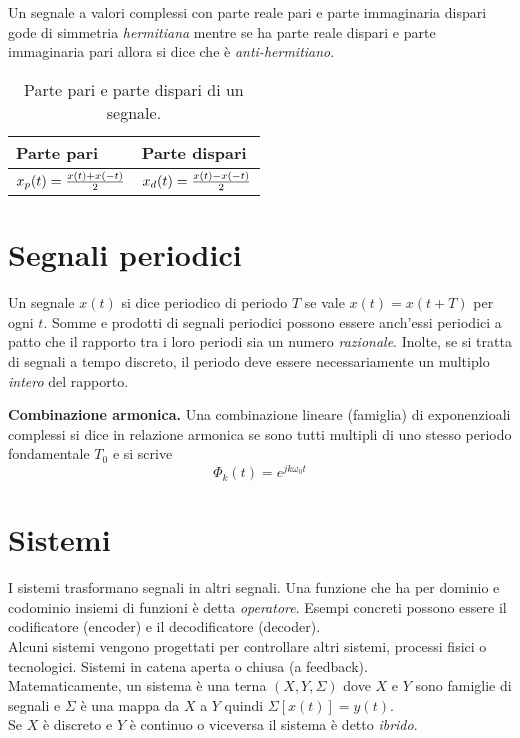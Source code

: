 \documentclass[a4paper,portrait,12pt]{article}
\theoremstyle{definition}
\begin{document}
Un segnale a valori complessi con parte reale pari e parte immaginaria dispari gode di simmetria 
\textit{hermitiana} mentre se ha parte reale dispari e parte immaginaria pari allora si dice che è
\textit{anti-hermitiano}.
\begin{table}[h]
\begin{center}
\begin{tabular}{|l||l|}
\hline Parte pari & Parte dispari\\
\hline \rule[-4mm]{0mm}{1cm} $x_p(t) = {x(t) + x(-t) \over 2}$ & $x_d(t) = {x(t) - x(-t) \over 2}$\\
\hline
\end{tabular}
\caption{Parte pari e parte dispari di un segnale.}
\end{center}
\end{table}
\bigskip


\section{Segnali periodici}

Un segnale $x(t)$ si dice periodico di periodo $T$ se vale $x(t) = x(t + T)$ per ogni $t$. Somme e prodotti
di segnali periodici possono essere anch'essi periodici a patto che il rapporto tra i loro periodi sia un
numero \textit{razionale}. Inolte, se si tratta di segnali a tempo discreto, il periodo deve essere 
necessariamente un multiplo \textit{intero} del rapporto.

\textbf{Combinazione armonica.} Una combinazione lineare (famiglia) di exponenzioali complessi si dice in 
relazione armonica se sono tutti multipli di uno stesso periodo fondamentale $T_0$ e si scrive
\begin{equation}
\Phi_k(t) = e^{jk\omega_0t}
\end{equation}
\bigskip


\section{Sistemi}

I sistemi trasformano segnali in altri segnali. Una funzione che ha per dominio e codominio insiemi di 
funzioni è detta \textit{operatore}. Esempi concreti possono essere il codificatore (encoder) e il 
decodificatore (decoder).\\ 
Alcuni sistemi vengono progettati per controllare altri sistemi, processi fisici o tecnologici. Sistemi 
in catena aperta o chiusa (a feedback).\\
Matematicamente, un sistema è una terna $(X,Y,\Sigma)$ dove $X$ e $Y$ sono famiglie di segnali e $\Sigma$ 
è una mappa da $X$ a $Y$ quindi $\Sigma[x(t)] = y(t)$.\\
Se $X$ è discreto e $Y$ è continuo o viceversa il sistema è detto \textit{ibrido}.
\bigskip
\end{document}
